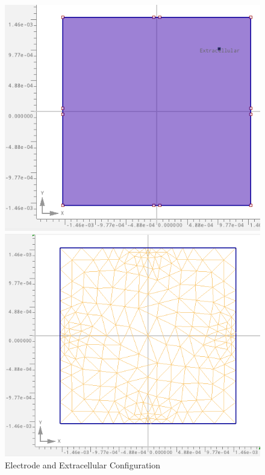 \documentclass{article}
\begin{document}
    \begin{figure}[htbp]
        \centering
        \begin{minipage}[b]{0.3\textwidth}
            \includegraphics[width=\textwidth]{FE_structure}
            \caption{Electrode and Extracellular Configuration}
            \label{fig:FE_structure}
        \end{minipage}
        \hfill
        \begin{minipage}[b]{0.3\textwidth}
            \includegraphics[width=\textwidth]{FE_mesh_1}

\end{minipage}
\end{figure}
\end{document}
